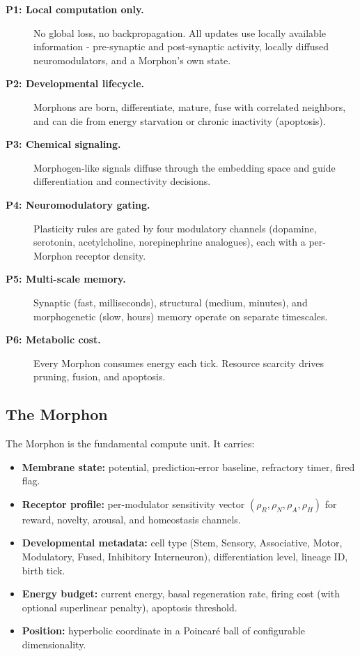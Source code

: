 \begin{description}
  \item[\textbf{P1: Local computation only.}] No global loss, no backpropagation. All updates use locally available information - pre-synaptic and post-synaptic activity, locally diffused neuromodulators, and a Morphon's own state.
  \item[\textbf{P2: Developmental lifecycle.}] Morphons are born, differentiate, mature, fuse with correlated neighbors, and can die from energy starvation or chronic inactivity (apoptosis).
  \item[\textbf{P3: Chemical signaling.}] Morphogen-like signals diffuse through the embedding space and guide differentiation and connectivity decisions.
  \item[\textbf{P4: Neuromodulatory gating.}] Plasticity rules are gated by four modulatory channels (dopamine, serotonin, acetylcholine, norepinephrine analogues), each with a per-Morphon receptor density.
  \item[\textbf{P5: Multi-scale memory.}] Synaptic (fast, milliseconds), structural (medium, minutes), and morphogenetic (slow, hours) memory operate on separate timescales.
  \item[\textbf{P6: Metabolic cost.}] Every Morphon consumes energy each tick. Resource scarcity drives pruning, fusion, and apoptosis.
\end{description}

\subsection{The Morphon}

The Morphon is the fundamental compute unit. It carries:
\begin{itemize}
  \item \textbf{Membrane state:} potential, prediction-error baseline, refractory timer, fired flag.
  \item \textbf{Receptor profile:} per-modulator sensitivity vector $(\rho_R, \rho_N, \rho_A, \rho_H)$ for reward, novelty, arousal, and homeostasis channels.
  \item \textbf{Developmental metadata:} cell type (Stem, Sensory, Associative, Motor, Modulatory, Fused, Inhibitory Interneuron), differentiation level, lineage ID, birth tick.
  \item \textbf{Energy budget:} current energy, basal regeneration rate, firing cost (with optional superlinear penalty), apoptosis threshold.
  \item \textbf{Position:} hyperbolic coordinate in a Poincaré ball of configurable dimensionality.
\end{itemize}

